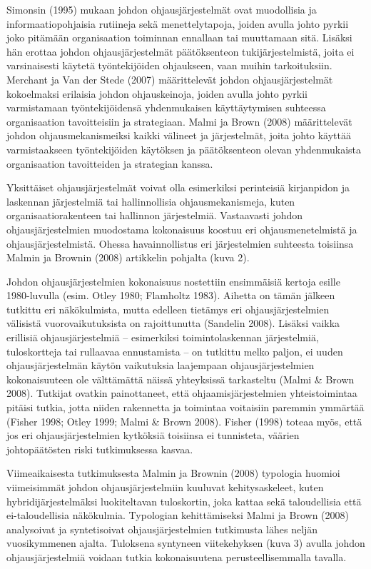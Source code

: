 \documentclass[12pt,a4paper,oneside,pdftex]{report}
\begin{document}
Simonsin (1995) mukaan johdon ohjausjärjestelmät ovat muodollisia ja informaatiopohjaisia rutiineja sekä menettelytapoja, joiden avulla johto pyrkii joko pitämään organisaation toiminnan ennallaan tai muuttamaan sitä. Lisäksi hän erottaa johdon ohjausjärjestelmät päätöksenteon tukijärjestelmistä, joita ei varsinaisesti käytetä työntekijöiden ohjaukseen, vaan muihin tarkoituksiin. Merchant ja Van der Stede (2007) määrittelevät johdon ohjausjärjestelmät kokoelmaksi erilaisia johdon ohjauskeinoja, joiden avulla johto pyrkii varmistamaan työntekijöidensä yhdenmukaisen käyttäytymisen suhteessa organisaation tavoitteisiin ja strategiaan. Malmi ja Brown (2008) määrittelevät johdon ohjausmekanismeiksi kaikki välineet ja järjestelmät, joita johto käyttää varmistaakseen työntekijöiden käytöksen ja päätöksenteon olevan yhdenmukaista organisaation tavoitteiden ja strategian kanssa. 

Yksittäiset ohjausjärjestelmät voivat olla esimerkiksi perinteisiä kirjanpidon ja laskennan järjestelmiä tai hallinnollisia ohjausmekanismeja, kuten organisaatiorakenteen tai hallinnon järjestelmiä. Vastaavasti johdon ohjausjärjestelmien muodostama kokonaisuus koostuu eri ohjausmenetelmistä ja ohjausjärjestelmistä. Ohessa havainnollistus eri järjestelmien suhteesta toisiinsa Malmin ja Brownin (2008) artikkelin pohjalta (kuva 2).

Johdon ohjausjärjestelmien kokonaisuus nostettiin ensimmäisiä kertoja esille 1980-luvulla (esim. Otley 1980; Flamholtz 1983). Aihetta on tämän jälkeen tutkittu eri näkökulmista, mutta edelleen tietämys eri ohjausjärjestelmien välisistä vuorovaikutuksista on rajoittunutta (Sandelin 2008). Lisäksi vaikka erillisiä ohjausjärjestelmiä – esimerkiksi toimintolaskennan järjestelmiä, tuloskortteja tai rullaavaa ennustamista – on tutkittu melko paljon, ei uuden ohjausjärjestelmän käytön vaikutuksia laajempaan ohjausjärjestelmien kokonaisuuteen ole välttämättä näissä yhteyksissä tarkasteltu (Malmi & Brown 2008). Tutkijat ovatkin painottaneet, että ohjaamisjärjestelmien yhteistoimintaa pitäisi tutkia, jotta niiden rakennetta ja toimintaa voitaisiin paremmin ymmärtää (Fisher 1998; Otley 1999; Malmi & Brown 2008). Fisher (1998) toteaa myös, että jos eri ohjausjärjestelmien kytköksiä toisiinsa ei tunnisteta, väärien johtopäätösten riski tutkimuksessa kasvaa.

Viimeaikaisesta tutkimuksesta Malmin ja Brownin (2008) typologia huomioi viimeisimmät johdon ohjausjärjestelmiin kuuluvat kehitysaskeleet, kuten hybridijärjestelmäksi luokiteltavan tuloskortin, joka kattaa sekä taloudellisia että ei-taloudellisia näkökulmia. Typologian kehittämiseksi Malmi ja Brown (2008) analysoivat ja syntetisoivat ohjausjärjestelmien tutkimusta lähes neljän vuosikymmenen ajalta. Tuloksena syntyneen viitekehyksen (kuva 3) avulla johdon ohjausjärjestelmiä voidaan tutkia kokonaisuutena perusteellisemmalla tavalla.
\end{document}
